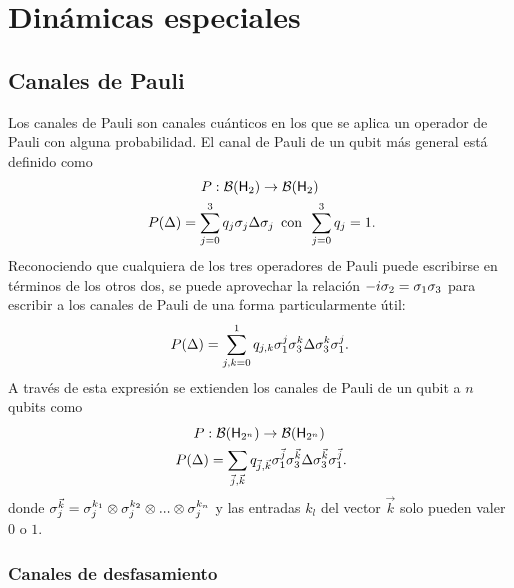 \section{Dinámicas especiales}

\subsection{Canales de Pauli}

Los canales de Pauli son canales cuánticos en los que se aplica un operador de Pauli con alguna probabilidad. El canal de Pauli de un qubit más general está definido como
\begin{gather}
    P:\mcB(\hilbert_{2}) \rightarrow \mcB(\hilbert_{2})\nonumber\\
    P(\Delta)=\sum_{j=0}^{3}q_{j}\pauli{j}\Delta\pauli{j}\,\text{ con }\, \sum_{j=0}^{3}q_{j}=1\rlap{.}\nonumber
\end{gather}
Reconociendo que cualquiera de los tres operadores de Pauli puede escribirse en términos de los otros dos, se puede aprovechar la relación $-i\sigma_{2}=\sigma_{1}\sigma_{3}$ para escribir a los canales de Pauli de una forma particularmente útil:
\begin{equation}
    P(\Delta)=\sum_{j,k=0}^{1}q_{j,k}\sigma_{1}^{j}\sigma_{3}^{k}\Delta\sigma_{3}^{k}\sigma_{1}^{j}.\nonumber
\end{equation}
A través de esta expresión se extienden los canales de Pauli de un qubit a $n$ qubits como 
\begin{gather}\label{eq:PauliChannelN}
    P:\mcB(\hilbert_{2^{n}}) \rightarrow \mcB(\hilbert_{2^{n}})\nonumber\\
    P(\Delta)=\sum_{\vec{j},\vec{k}}q_{\vec{j},\vec{k}}\pauli{1}^{\vec{j}}\pauli{3}^{\vec{k}}\Delta\pauli{3}^{\vec{k}}\pauli{1}^{\vec{j}}\rlap{.}
\end{gather}
donde $\sigma_{j}^{\vec{k}}=\sigma_{j}^{k_{1}}\otimes\sigma_{j}^{k_{2}}\otimes ... \otimes \sigma_{j}^{k_{n}}$ y las entradas $k_{l}$ del vector $\vec{k}$ solo pueden valer $0$ o $1$.

\subsubsection{Canales de desfasamiento}

